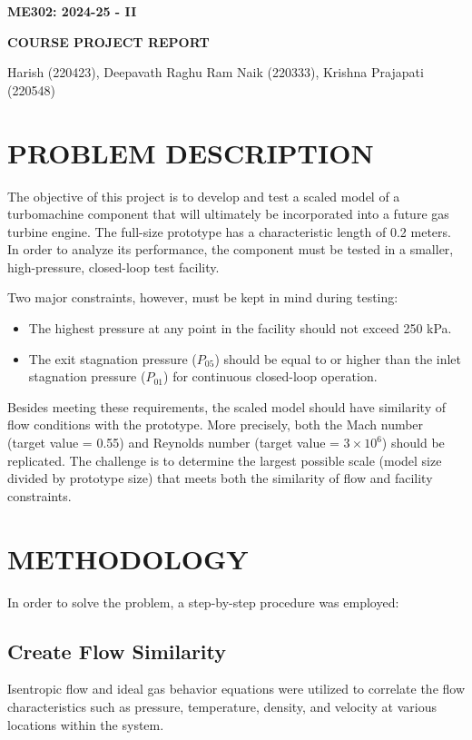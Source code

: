 \documentclass[12pt,a4paper]{article}
\begin{document}
\begin{titlepage}
\centering
\vspace*{3cm}
{\LARGE \textbf{ME302: 2024-25 - II} \par}
\vspace{1cm}
{\LARGE \textbf{COURSE PROJECT REPORT} \par}
\vspace{2cm}
{\Large Harish (220423), Deepavath Raghu Ram Naik (220333), Krishna Prajapati (220548)\par}
\end{titlepage}

\section*{PROBLEM DESCRIPTION}
The objective of this project is to develop and test a scaled model of a turbomachine component that will ultimately be incorporated into a future gas turbine engine. The full-size prototype has a characteristic length of 0.2 meters. In order to analyze its performance, the component must be tested in a smaller, high-pressure, closed-loop test facility.

Two major constraints, however, must be kept in mind during testing:
\begin{itemize}
    \item The highest pressure at any point in the facility should not exceed 250 kPa.
    \item The exit stagnation pressure ($P_{05}$) should be equal to or higher than the inlet stagnation pressure ($P_{01}$) for continuous closed-loop operation.
\end{itemize}

Besides meeting these requirements, the scaled model should have similarity of flow conditions with the prototype. More precisely, both the Mach number (target value = 0.55) and Reynolds number (target value = $3 \times 10^6$) should be replicated. The challenge is to determine the largest possible scale (model size divided by prototype size) that meets both the similarity of flow and facility constraints.

\section*{METHODOLOGY}
In order to solve the problem, a step-by-step procedure was employed:

\subsection*{Create Flow Similarity}
Isentropic flow and ideal gas behavior equations were utilized to correlate the flow characteristics such as pressure, temperature, density, and velocity at various locations within the system.
\end{document}

